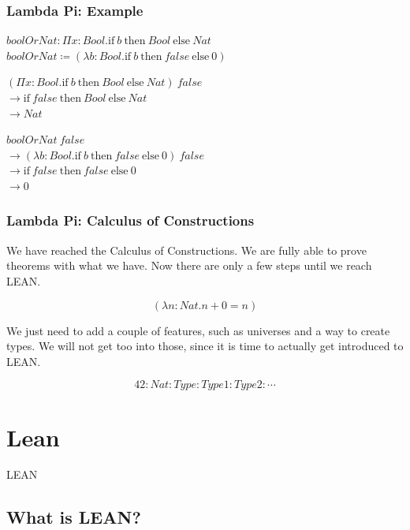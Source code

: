 \documentclass{beamer}
\newcommand{\ha}[3]{\text{if}\ #1\ \text{then}\ #2\ \text{else}\ #3}
\begin{document}
\begin{frame}
  \frametitle{Lambda Pi: Example}
  $boolOrNat : \Pi x : Bool . \ha{b}{Bool}{Nat}$ \\
  $boolOrNat \coloneqq (\lambda b : Bool . \ha{b}{false}{0})$

  \vspace{1cm}

  $(\Pi x : Bool . \ha{b}{Bool}{Nat})\ false$ \\
  $\rightarrow \ha{false}{Bool}{Nat}$\\
  $\rightarrow Nat$

  \vspace{5mm}

  $boolOrNat\ false$\\
  $\rightarrow (\lambda b : Bool . \ha{b}{false}{0})\ false$\\
  $\rightarrow \ha{false}{false}{0}$\\
  $\rightarrow 0$\\

\end{frame}

\begin{frame}
  \frametitle{Lambda Pi: Calculus of Constructions}

  We have reached the Calculus of Constructions. We are fully able to prove theorems with what we have. Now there are only a few steps until we reach LEAN.

  \vspace{5mm}

  $$(\lambda n : Nat . n + 0 = n)$$

  \vspace{5mm}

  We just need to add a couple of features, such as universes and a way to create types. We will not get too into those, since it is time to actually get introduced to LEAN.

  $$42 : Nat : Type : Type 1 : Type 2 : \cdots$$

\end{frame}

\section{Lean}

\begin{frame}
  \centering
  \vfill
  {\Huge LEAN}
  \vfill
\end{frame}

\subsection{What is LEAN?}
\end{document}
